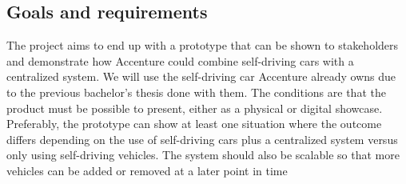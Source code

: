 \subsection{Goals and requirements}
The project aims to end up with a prototype that can be shown to stakeholders and demonstrate how Accenture could combine self-driving cars with a centralized system. We will use the self-driving car Accenture already owns due to the previous bachelor's thesis done with them. The conditions are that the product must be possible to present, either as a physical or digital showcase. Preferably, the prototype can show at least one situation where the outcome differs depending on the use of self-driving cars plus a centralized system versus only using self-driving vehicles. The system should also be scalable so that more vehicles can be added or removed at a later point in time